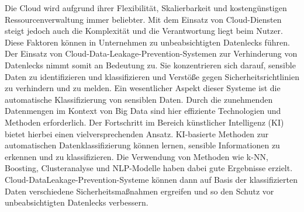 Die Cloud wird aufgrund ihrer Flexibilität, Skalierbarkeit und kostengünstigen Ressourcenverwaltung immer beliebter. Mit dem Einsatz von Cloud-Diensten steigt jedoch auch die Komplexität und die Verantwortung liegt beim Nutzer. Diese Faktoren können in Unternehmen zu unbeabsichtigten Datenlecks führen. Der Einsatz von Cloud-Data-Leakage-Prevention-Systemen zur Verhinderung von Datenlecks nimmt somit an Bedeutung zu. Sie konzentrieren sich darauf, sensible Daten zu identifizieren und klassifizieren und Verstöße gegen Sicherheitsrichtlinien zu verhindern und zu melden. Ein wesentlicher Aspekt dieser Systeme ist die automatische Klassifizierung von sensiblen Daten. Durch die zunehmenden Datenmengen im Kontext von Big Data sind hier effiziente Technologien und Methoden erforderlich. Der Fortschritt im Bereich künstlicher Intelligenz (KI) bietet hierbei einen vielversprechenden Ansatz. KI-basierte Methoden zur automatischen Datenklassifizierung können lernen, sensible Informationen zu erkennen und zu klassifizieren. Die Verwendung von Methoden wie k-NN, Boosting, Clusteranalyse und NLP-Modelle haben dabei gute Ergebnisse erzielt. Cloud-DataLeakage-Prevention-Systeme können dann auf Basis der klassifizierten Daten verschiedene Sicherheitsmaßnahmen ergreifen und so den Schutz vor unbeabsichtigten Datenlecks verbessern.

